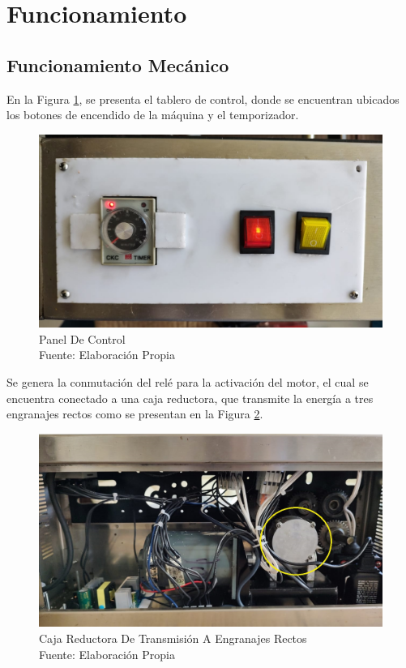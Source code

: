 \newpage	
\section{Funcionamiento}

\subsection{Funcionamiento Mecánico}
En la Figura \ref{fig:indicador}, se presenta el tablero de control, donde se encuentran ubicados los botones de encendido de la máquina y el temporizador.

\begin{figure}[ht]
	\centering
	\includegraphics[angle=270, scale=0.28]{Figs/200.jpg}
	\caption{Panel De Control\\Fuente: Elaboración Propia}
	\label{fig:indicador}
\end{figure}

Se genera la conmutación del relé para la activación del motor, el cual se encuentra conectado a una caja reductora, que transmite la energía a tres engranajes rectos como se presentan en la Figura \ref{fig:caja}.

\begin{figure}[ht]
	\centering
	\includegraphics[scale=0.28]{Figs/201.jpg}
	\caption{Caja Reductora De Transmisión A Engranajes Rectos\\Fuente: Elaboración Propia}
	\label{fig:caja}
\end{figure}

